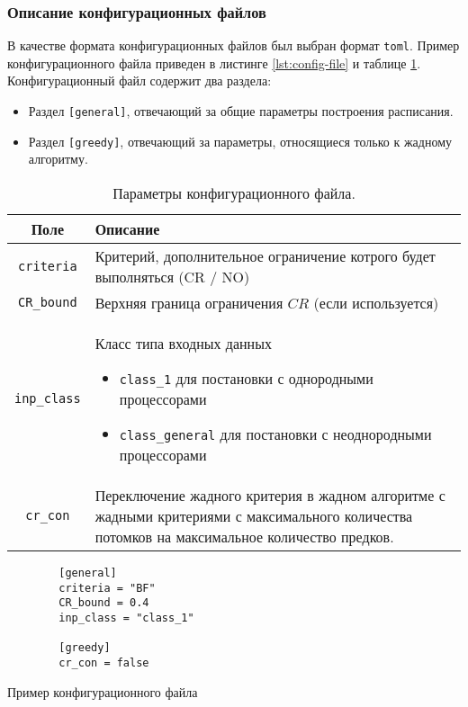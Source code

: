\subsubsection{Описание конфигурационных файлов}
В качестве формата конфигурационных файлов был выбран формат \texttt{toml}. Пример конфигурационного файла приведен в листинге \ref{lst:config-file} и таблице \ref{tbl:config-file-parameters}. Конфигурационный файл содержит два раздела:
\begin{itemize}
    \item Раздел \texttt{[general]}, отвечающий за общие параметры построения расписания.
    \item Раздел \texttt{[greedy]}, отвечающий за параметры, относящиеся только к жадному алгоритму.
\end{itemize}

\begin{table}[!htbp]
    \centering
    \begin{tabularx}{\textwidth}{|c|X|}
        \hline
        Поле                & Описание                                                                                                                                      \\
        \hline
        \texttt{criteria}   & Критерий, дополнительное ограничение котрого будет выполняться (CR / NO)                                                                      \\
        \hline
        \texttt{CR\_bound}  & Верхняя граница ограничения $CR$ (если используется)                                                                                          \\
        \hline
        \texttt{inp\_class} & Класс типа входных данных
        \begin{itemize}
            \item \texttt{class\_1} для постановки с однородными процессорами
            \item \texttt{class\_general} для постановки с неоднородными процессорами
        \end{itemize}                                                                                            \\
        \hline
        \texttt{cr\_con}    & Переключение жадного критерия в жадном алгоритме с жадными критериями с максимального количества потомков на максимальное количество предков. \\
        \hline
    \end{tabularx}
    \caption{Параметры конфигурационного файла.}
    \label{tbl:config-file-parameters}
\end{table}
\begin{listing}
    \begin{verbatim}
        [general] 
        criteria = "BF" 
        CR_bound = 0.4 
        inp_class = "class_1" 
        
        [greedy] 
        cr_con = false
    \end{verbatim}
    \caption{Пример конфигурационного файла}
    \label{lst:config-file}
\end{listing}

